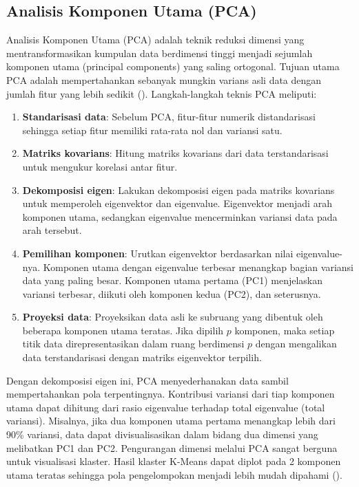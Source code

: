 \subsection{Analisis Komponen Utama (PCA)}
Analisis Komponen Utama (PCA) adalah teknik reduksi dimensi yang mentransformasikan kumpulan data berdimensi tinggi menjadi sejumlah komponen utama (principal components) yang saling ortogonal. Tujuan utama PCA adalah mempertahankan sebanyak mungkin varians asli data dengan jumlah fitur yang lebih sedikit (\cite{You2020}). Langkah-langkah teknis PCA meliputi:
\begin{enumerate}
    \item \textbf{Standarisasi data}: Sebelum PCA, fitur-fitur numerik distandarisasi sehingga setiap fitur memiliki rata-rata nol dan variansi satu.
    \item \textbf{Matriks kovarians}: Hitung matriks kovarians dari data terstandarisasi untuk mengukur korelasi antar fitur.
    \item \textbf{Dekomposisi eigen}: Lakukan dekomposisi eigen pada matriks kovarians untuk memperoleh eigenvektor dan eigenvalue. Eigenvektor menjadi arah komponen utama, sedangkan eigenvalue mencerminkan variansi data pada arah tersebut.
    \item \textbf{Pemilihan komponen}: Urutkan eigenvektor berdasarkan nilai eigenvalue-nya. Komponen utama dengan eigenvalue terbesar menangkap bagian variansi data yang paling besar. Komponen utama pertama (PC1) menjelaskan variansi terbesar, diikuti oleh komponen kedua (PC2), dan seterusnya.
    \item \textbf{Proyeksi data}: Proyeksikan data asli ke subruang yang dibentuk oleh beberapa komponen utama teratas. Jika dipilih $p$ komponen, maka setiap titik data direpresentasikan dalam ruang berdimensi $p$ dengan mengalikan data terstandarisasi dengan matriks eigenvektor terpilih.
\end{enumerate}

Dengan dekomposisi eigen ini, PCA menyederhanakan data sambil mempertahankan pola terpentingnya. Kontribusi variansi dari tiap komponen utama dapat dihitung dari rasio eigenvalue terhadap total eigenvalue (total variansi). Misalnya, jika dua komponen utama pertama menangkap lebih dari 90\% variansi, data dapat divisualisasikan dalam bidang dua dimensi yang melibatkan PC1 dan PC2.
Pengurangan dimensi melalui PCA sangat berguna untuk visualisasi klaster. Hasil klaster K-Means dapat diplot pada 2 komponen utama teratas sehingga pola pengelompokan menjadi lebih mudah dipahami (\cite{Decheva2018}).

